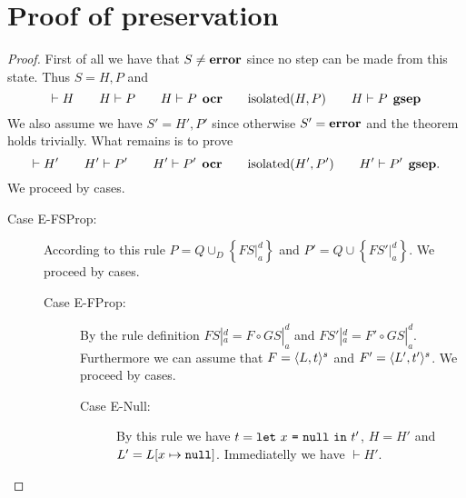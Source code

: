 
\section{Proof of preservation}
\label{sec:proof_of_preservation}

\begin{proof} 
  First of all we have that $S \neq \mbox{{\bf error}}$ since no step can be made from this
  state. Thus $S = H, P$ and
  \begin{equation*}
    \vdash H \quad\quad H \vdash P \quad\quad H \vdash P \:\: \mbox{\bf ocr} \quad\quad
    \mbox{$\mathrm{isolated}$}{(H, P)} \quad\quad H \vdash P \:\: \mbox{\bf gsep}
  \end{equation*}
  We also assume we have $S' = H', P'$ since otherwise $S' = \mbox{{\bf error}}$ and the
  theorem holds trivially. What remains is to prove
  \begin{equation*}
    \vdash H' \quad\quad H' \vdash P' \quad\quad H' \vdash P' \:\: \mbox{\bf ocr} \quad\quad
    \mbox{$\mathrm{isolated}$}{(H', P')} \quad\quad H' \vdash P' \:\: \mbox{\bf gsep}.
  \end{equation*}
  We proceed by cases.
  \begin{description}
    \item[Case {\sc E-FSProp}:] According to this rule $P = Q \cup_D \left\{
        FS|_a^d \right\}$ and $P' = Q \cup \left\{ FS'|_a^d \right\}$. We proceed by cases.
      \begin{description}
        \item[Case {\sc E-FProp}:] By the rule definition $FS|_a^d = F \circ
          GS|_a^d$ and $FS'|_a^d = F' \circ GS|_a^d$. Furthermore we can assume
          that $F = \mbox{$\langle L, t \rangle^s$}$ and $F' = \mbox{$\langle L', t' \rangle^s$}$.
          We proceed by cases.
          \begin{description}
            \item[Case {\sc E-Null}:] By this rule we have $t =
              \mbox{\texttt{let}~$x$~\texttt{=}~$\mbox{\texttt{null}}$~\texttt{in}~$t'$}$, $H = H'$ and $L' = L[x \mapsto \mbox{\texttt{null}}]$.
              Immediatelly we have $\vdash H'$.


\end{description}
\end{description}
\end{description}
\end{proof}
